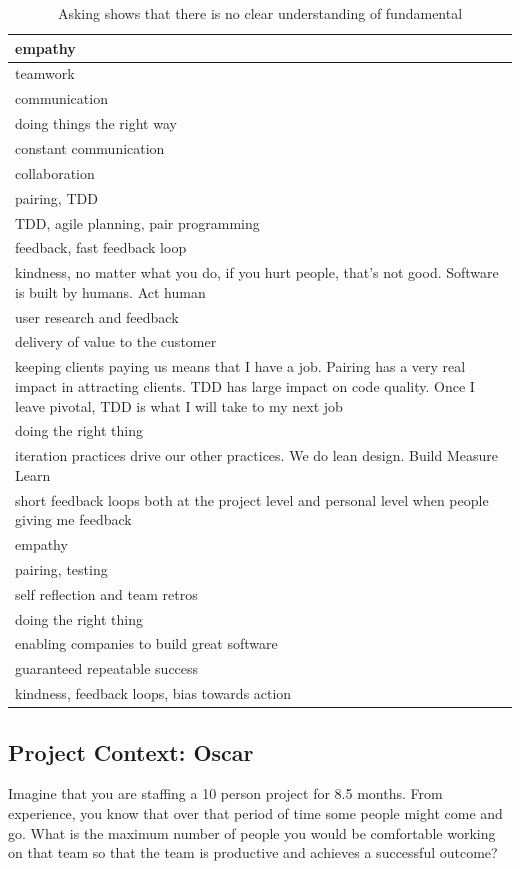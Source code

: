\begin{table}[t]
\renewcommand{\arraystretch}{1.3}
\centering
\caption{Asking  shows that there is no clear understanding of fundamental}
\label{CorePractice}
\begin{tabular}{|p{3.10in}|}
\hline
empathy \\ \hline
teamwork \\ \hline
communication \\ \hline
doing things the right way \\ \hline
constant communication \\ \hline
collaboration \\ \hline
pairing, TDD \\ \hline
TDD, agile planning, pair programming \\ \hline
feedback, fast feedback loop \\ \hline
kindness, no matter what you do, if you hurt people, that's not good. Software is built by humans. Act human \\ \hline
user research and feedback \\ \hline
delivery of value to the customer \\ \hline
keeping clients paying us means that I have a job. Pairing has a very real impact in attracting clients. TDD has large impact on code quality. Once I leave pivotal, TDD is what I will take to my next job \\ \hline
doing the right thing \\ \hline
iteration practices drive our other practices. We do lean design. Build Measure Learn \\ \hline
short feedback loops both at the project level and personal level when people giving me feedback \\ \hline
empathy \\ \hline
pairing, testing \\ \hline
self reflection and  team retros \\ \hline
doing the right thing \\ \hline
enabling companies to build great software \\ \hline
guaranteed repeatable success \\ \hline
kindness, feedback loops, bias towards action \\
\hline
\end{tabular}
\end{table}

\subsection{Project Context: Oscar}
\label{ExampleInAction}
Imagine that you are staffing a 10 person project for 8.5 months. From experience, you know that over that period of time some people might come and go. What is the maximum number of people you would be comfortable working on that team so that the team is productive and achieves a successful outcome?  


